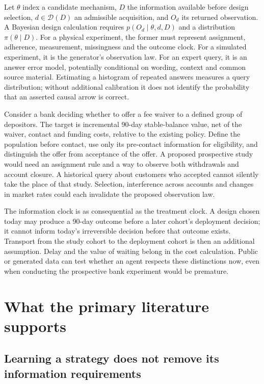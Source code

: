 Let $\theta$ index a candidate mechanism, $D$ the information available before
design selection, $d\in\mathcal D(D)$ an admissible acquisition, and $O_d$ its
returned observation. A Bayesian design calculation requires
$p(O_d\mid\theta,d,D)$ and a distribution $\pi(\theta\mid D)$.
For a physical experiment, the former must represent assignment, adherence,
measurement, missingness and the outcome clock. For a simulated experiment,
it is the generator's observation law. For an expert query, it is an answer
error model, potentially conditional on wording, context and common source
material. Estimating a histogram of repeated answers measures a query
distribution; without additional calibration it does not identify the
probability that an asserted causal arrow is correct.

Consider a bank deciding whether to offer a fee waiver to a defined group of
depositors. The target is incremental 90-day stable-balance value, net of the
waiver, contact and funding costs, relative to the existing policy. Define
the population before contact, use only its pre-contact information for
eligibility, and distinguish the offer from acceptance of the offer. A
proposed prospective study would need an assignment rule and a way to
observe both withdrawals and account closure. A historical query about
customers who accepted cannot silently take the place of that study.
Selection, interference across accounts and changes in market rates could
each invalidate the proposed observation law.

The information clock is as consequential as the treatment clock. A design
chosen today may produce a 90-day outcome before a later cohort's deployment
decision; it cannot inform today's irreversible decision before that outcome
exists. Transport from the study cohort to the deployment cohort is then an
additional assumption. Delay and the value of waiting belong in the cost
calculation. Public or generated data can test whether an agent respects these
distinctions now, even when conducting the prospective bank experiment would
be premature.

\section{What the primary literature supports}

\subsection{Learning a strategy does not remove its information requirements}

